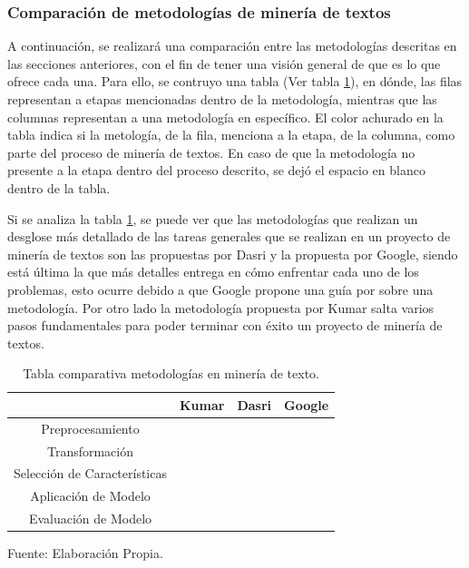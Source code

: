\subsubsection{Comparación de metodologías de minería de textos}
    A continuación, se realizará una comparación entre las metodologías descritas en las secciones anteriores, con el fin de tener una visión general de que es lo que ofrece cada una. Para ello, se contruyo una tabla (Ver tabla \ref{table:comparación_metodologías_tm}), en dónde, las filas representan a etapas mencionadas dentro de la metodología, mientras que las columnas representan a una metodología en específico. El color achurado en la tabla indica si la metología, de la fila, menciona a la etapa, de la columna, como parte del proceso de minería de textos. En caso de que la metodología no presente a la etapa dentro del proceso descrito, se dejó el espacio en blanco dentro de la tabla.
    
    Si se analiza la tabla \ref{table:comparación_metodologías_tm}, se puede ver que las metodologías que realizan un desglose más detallado de las tareas generales que se realizan en un proyecto de minería de textos son las propuestas por Dasri y la propuesta por Google, siendo está última la que más detalles entrega en cómo enfrentar cada uno de los problemas, esto ocurre debido a que Google propone una guía por sobre una metodología. Por otro lado la metodología propuesta por Kumar salta varios pasos fundamentales para poder terminar con éxito un proyecto de minería de textos.

    \begin{table}[H]
    \centering
    \begin{tabular}{c|c|c|c|}
    \cline{2-4}
                                                       & Kumar                    & Dasri                    & Google                   \\ \hline
    \multicolumn{1}{|c|}{Preprocesamiento}             & \cellcolor[HTML]{DAE8FC} & \cellcolor[HTML]{DAE8FC} & \cellcolor[HTML]{DAE8FC} \\ \hline
    \multicolumn{1}{|c|}{Transformación}               & \cellcolor[HTML]{DAE8FC} &                          & \cellcolor[HTML]{DAE8FC} \\ \hline
    \multicolumn{1}{|c|}{Selección de Características} & \cellcolor[HTML]{DAE8FC} &                          & \cellcolor[HTML]{DAE8FC} \\ \hline
    \multicolumn{1}{|c|}{Aplicación de Modelo}         & \cellcolor[HTML]{DAE8FC} & \cellcolor[HTML]{DAE8FC} & \cellcolor[HTML]{DAE8FC} \\ \hline
    \multicolumn{1}{|c|}{Evaluación de Modelo}         & \cellcolor[HTML]{DAE8FC} & \cellcolor[HTML]{DAE8FC} & \cellcolor[HTML]{DAE8FC} \\ \hline
    \end{tabular}
    \caption{\label{table:comparación_metodologías_tm} Tabla comparativa metodologías en minería de texto.} Fuente: Elaboración Propia.
    \end{table}
    
